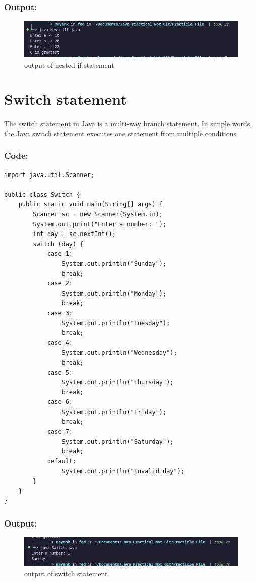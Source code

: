 \documentclass[a4paper,12pt]{article}
\begin{document}
\subsubsection{Output: }
\begin{figure}[H]
    \centering
    \includegraphics[width=0.9\linewidth]{images/NestOut.png}
    \caption{output of nested-if statement}
    \label{fig:sample_image}
\end{figure}

\section{Switch statement}
The switch statement in Java is a multi-way branch statement. In simple words, the Java
switch statement executes one statement from multiple conditions.
\subsubsection{Code: }
\begin{lstlisting}
import java.util.Scanner;

public class Switch {
    public static void main(String[] args) {
        Scanner sc = new Scanner(System.in);
        System.out.print("Enter a number: ");
        int day = sc.nextInt();
        switch (day) {
            case 1:
                System.out.println("Sunday");
                break;
            case 2:
                System.out.println("Monday");
                break;
            case 3:
                System.out.println("Tuesday");
                break;
            case 4:
                System.out.println("Wednesday");
                break;
            case 5:
                System.out.println("Thursday");
                break;
            case 6:
                System.out.println("Friday");
                break;
            case 7:
                System.out.println("Saturday");
                break;
            default:
                System.out.println("Invalid day");
        }
    }
}
\end{lstlisting}
\subsubsection{Output: }
\begin{figure}[H]
    \centering
    \includegraphics[width=0.9\linewidth]{images/SwitchOut.png}
    \caption{output of switch statement}
    \label{fig:sample_image}
\end{figure}
\end{document}
